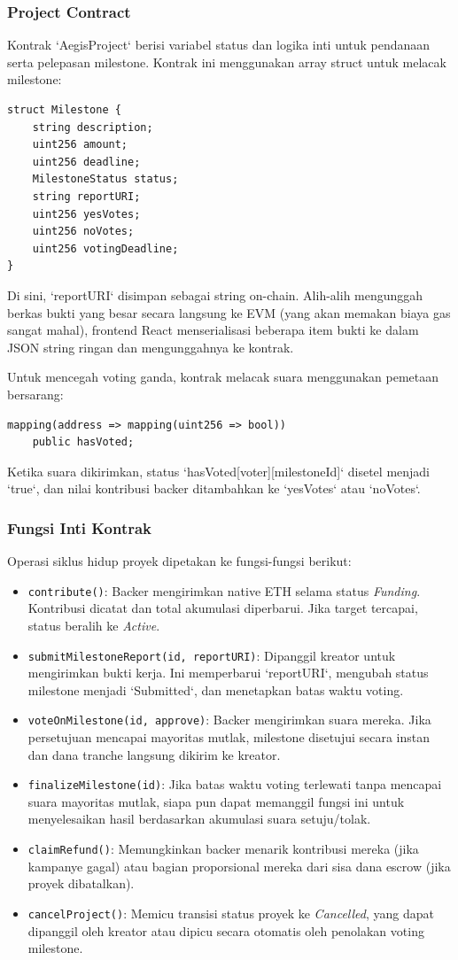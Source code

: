 \documentclass[conference]{IEEEtran}
\begin{document}
\subsubsection{Project Contract}
Kontrak `AegisProject` berisi variabel status dan logika inti untuk pendanaan serta pelepasan milestone. Kontrak ini menggunakan array struct untuk melacak milestone:
\begin{verbatim}
struct Milestone {
    string description;
    uint256 amount;
    uint256 deadline;
    MilestoneStatus status;
    string reportURI;
    uint256 yesVotes;
    uint256 noVotes;
    uint256 votingDeadline;
}
\end{verbatim}
Di sini, `reportURI` disimpan sebagai string on-chain. Alih-alih mengunggah berkas bukti yang besar secara langsung ke EVM (yang akan memakan biaya gas sangat mahal), frontend React menserialisasi beberapa item bukti ke dalam JSON string ringan dan mengunggahnya ke kontrak.

Untuk mencegah voting ganda, kontrak melacak suara menggunakan pemetaan bersarang:
\begin{verbatim}
mapping(address => mapping(uint256 => bool)) 
    public hasVoted;
\end{verbatim}
Ketika suara dikirimkan, status `hasVoted[voter][milestoneId]` disetel menjadi `true`, dan nilai kontribusi backer ditambahkan ke `yesVotes` atau `noVotes`.

\subsubsection{Fungsi Inti Kontrak}
Operasi siklus hidup proyek dipetakan ke fungsi-fungsi berikut:
\begin{itemize}
	\item \texttt{contribute()}: Backer mengirimkan native ETH selama status \textit{Funding}. Kontribusi dicatat dan total akumulasi diperbarui. Jika target tercapai, status beralih ke \textit{Active}.
	\item \texttt{submitMilestoneReport(id, reportURI)}: Dipanggil kreator untuk mengirimkan bukti kerja. Ini memperbarui `reportURI`, mengubah status milestone menjadi `Submitted`, dan menetapkan batas waktu voting.
	\item \texttt{voteOnMilestone(id, approve)}: Backer mengirimkan suara mereka. Jika persetujuan mencapai mayoritas mutlak, milestone disetujui secara instan dan dana tranche langsung dikirim ke kreator.
	\item \texttt{finalizeMilestone(id)}: Jika batas waktu voting terlewati tanpa mencapai suara mayoritas mutlak, siapa pun dapat memanggil fungsi ini untuk menyelesaikan hasil berdasarkan akumulasi suara setuju/tolak.
	\item \texttt{claimRefund()}: Memungkinkan backer menarik kontribusi mereka (jika kampanye gagal) atau bagian proporsional mereka dari sisa dana escrow (jika proyek dibatalkan).
	\item \texttt{cancelProject()}: Memicu transisi status proyek ke \textit{Cancelled}, yang dapat dipanggil oleh kreator atau dipicu secara otomatis oleh penolakan voting milestone.
\end{itemize}
\end{document}
